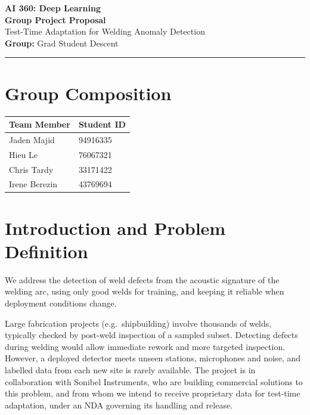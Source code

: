 \documentclass[11pt]{article}
\newcommand{\coursename}{AI 360: Deep Learning}
\newcommand{\groupname}{Grad Student Descent}
\newcommand{\projecttitle}{Test-Time Adaptation for Welding Anomaly Detection}
\begin{document}
\begin{center}
    {\Large \textbf{\coursename}}\\[0.4em]
    {\LARGE \textbf{Group Project Proposal}}\\[1em]
    {\large \projecttitle}\\[1em]
    \textbf{Group:} \groupname\\
\end{center}

\vspace{0.2em}
\hrule
\vspace{0.2em}

\section{Group Composition}

\begin{center}
\begin{tabularx}{\textwidth}{l l}
    \toprule
    \textbf{Team Member} &
    \textbf{Student ID} \\
    \midrule
    Jaden Majid & 94916335 \\
    Hieu Le & 76067321 \\
    Chris Tardy & 33171422 \\
    Irene Berezin & 43769694 \\
    \bottomrule
\end{tabularx}
\end{center}

\section{Introduction and Problem Definition}
\setlength{\parskip}{0.6em}

We address the detection of weld defects from the acoustic signature of the welding arc, using only good welds for training, and keeping it reliable when deployment conditions change.

Large fabrication projects (e.g.\ shipbuilding) involve thousands of welds, typically checked by post-weld inspection of a sampled subset. Detecting defects during welding would allow immediate rework and more targeted inspection. However, a deployed detector meets unseen stations, microphones and noise, and labelled data from each new site is rarely available. The project is in collaboration with Sonibel Instruments, who are building commercial solutions to this problem, and from whom we intend to receive proprietary data for test-time adaptation, under an NDA governing its handling and release.
\end{document}
